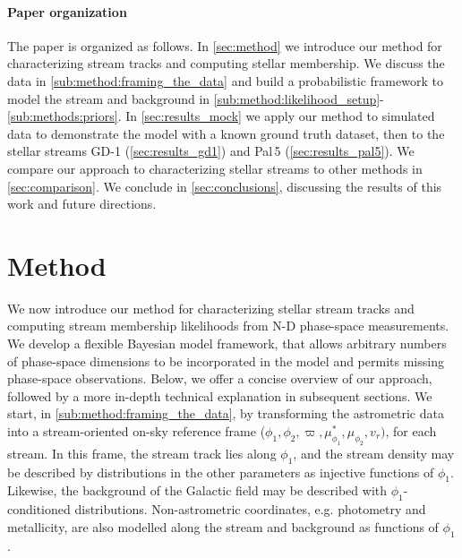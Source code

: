 \documentclass[twocolumn]{aastex631}
\newcommand{\stream}[1]{#1}
\newcommand{\parallax}{\varpi}
\begin{document}
    \paragraph{Paper organization}

        The paper is organized as follows.  In \autoref{sec:method} we introduce
        our method for characterizing stream tracks and computing stellar
        membership.  We discuss the data in \autoref{sub:method:framing_the_data} and
        build a probabilistic framework to model the stream and background in
        \autoref{sub:method:likelihood_setup}-\autoref{sub:methods:priors}.  In
        \autoref{sec:results_mock} we apply our method to simulated data to
        demonstrate the model with a known ground truth dataset, then to the
        stellar streams \stream{GD-1} (\autoref{sec:results_gd1}) and
        \stream{Pal\,5} (\autoref{sec:results_pal5}).  We compare our approach
        to characterizing stellar streams to other methods in
        \autoref{sec:comparison}.  We conclude in \autoref{sec:conclusions},
        discussing the results of this work and future directions.


\section{Method} \label{sec:method}

    We now introduce our method for characterizing stellar stream tracks and
    computing stream membership likelihoods from N-D phase-space measurements.
    We develop a flexible Bayesian model framework, that allows arbitrary
    numbers of phase-space dimensions to be incorporated in the model and
    permits missing phase-space observations.  Below, we offer a concise
    overview of our approach, followed by a more in-depth technical explanation
    in subsequent sections.  We start, in \autoref{sub:method:framing_the_data}, by
    transforming the astrometric data into a stream-oriented on-sky reference
    frame ($\phi_1, \phi_2, \parallax, \mu_{\phi_1}^*, \mu_{\phi_2}, v_r)$, for
    each stream. In this frame, the stream track lies along $\phi_1$, and the
    stream density may be described by distributions in the other parameters as
    injective functions of $\phi_1$.
    Likewise, the background of the Galactic field may be described with
    $\phi_1$-conditioned distributions.
    Non-astrometric coordinates, e.g. photometry and metallicity, are also
    modelled along the stream and background as functions of $\phi_1$.
\end{document}
